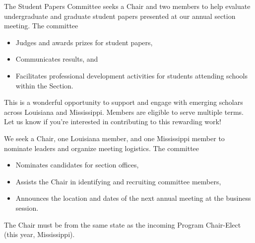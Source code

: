 \documentclass[10pt]{article} %
\begin{document}
\begin{minipage}[t]{\linewidth}
\begin{minipage}{.5\textwidth}
\begin{mdframed}[style=intextbox,frametitle={}]
      \hypertarget{studentpaperscommittee}{} %
      The Student Papers Committee seeks a Chair and two members to help evaluate undergraduate and graduate student papers presented at our annual section meeting.
      The committee
      \begin{itemize}
      \item 
	Judges and awards prizes for student papers,
      \item
	Communicates results, and
      \item
        Facilitates professional development activities for students attending schools within the Section.
      \end{itemize}
      This is a wonderful opportunity to support and engage with emerging scholars across Louisiana and Mississippi.
      Members are eligible to serve multiple terms. Let us know if you’re interested in contributing to this rewarding work!
      \BackToContents %

    \end{mdframed}%
  \end{minipage}
  \begin{minipage}{.5\textwidth}
    \begin{mdframed}[style=intextbox,frametitle={}] %

      \hypertarget{locationcommittee}{} %
      We seek a Chair, one Louisiana member, and one Mississippi member to nominate leaders and organize meeting logistics.
      The committee 
      \begin{itemize}
      \item
        Nominates candidates for section offices,
      \item
        Assists the Chair in identifying and recruiting committee members,
      \item
	Announces the location and dates of the next annual meeting at the business session.
      \end{itemize}
      The Chair must be from the same state as the incoming Program Chair-Elect (this year, Mississippi).
      \BackToContents %

    \end{mdframed}
  \end{minipage}
  \begin{minipage}{.5\textwidth}
    \begin{mdframed}[style=intextbox,frametitle={}] %


\end{mdframed}
\end{minipage}
\end{minipage}
\end{document}
